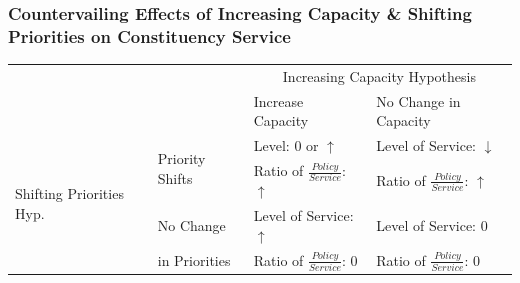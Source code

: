 \documentclass[xcolor=dvipsnames]{beamer}
\begin{document}
\begin{frame}
\frametitle{Countervailing Effects of Increasing Capacity \& Shifting Priorities on Constituency Service}

\renewcommand{\arraystretch}{1.1}%

\begin{table}[h]


\begin{tabular}[t]{p{.10\linewidth}|p{.16\linewidth}|p{.27\linewidth}|p{.27\linewidth}|}

\multicolumn{2}{l}{\multirow{2}{*}{}} & \multicolumn{2}{c}{Increasing Capacity Hypothesis} \\ \cline{3-4}

\multicolumn{2}{l|}{}    &  Increase Capacity  &   No Change in Capacity \\ \cline{2-4} 

\multirow{4}{1.8cm}{Shifting Priorities Hyp.}  &   \multirow{2}{3cm}{Priority Shifts}   &  Level: 0 or $\uparrow$  &  Level of Service: $\downarrow$  \\ 

& &  Ratio of $\frac{Policy}{Service}$: $\uparrow$   &   Ratio of $\frac{Policy}{Service}$: $\uparrow$  \\ \cline{2-4}

 &  No Change    &  Level of Service: $\uparrow$  & Level of Service: $0$ \\ 

 & in Priorities &   Ratio of $\frac{Policy}{Service}$: $0$  & Ratio of $\frac{Policy}{Service}$: $0$\\ \cline{2-4}

\end{tabular}

\end{table}


\renewcommand{\arraystretch}{1}%

\end{frame}
\end{document}
